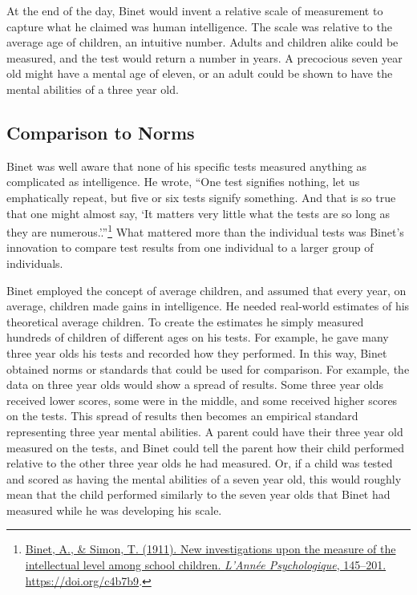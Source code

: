 \documentclass[
  oneside,
  12pt]{crumpbook}
\begin{document}
At the end of the day, Binet would invent a relative scale of measurement to capture what he claimed was human intelligence. The scale was relative to the average age of children, an intuitive number. Adults and children alike could be measured, and the test would return a number in years. A precocious seven year old might have a mental age of eleven, or an adult could be shown to have the mental abilities of a three year old.

\hypertarget{comparison-to-norms}{%
\subsection{Comparison to Norms}\label{comparison-to-norms}}

Binet was well aware that none of his specific tests measured anything as complicated as intelligence. He wrote, ``One test signifies nothing, let us emphatically repeat, but five or six tests signify
something. And that is so true that one might almost say, `It matters very little what the tests are so long as they are numerous.'.''\footnote{\protect\hyperlink{ref-binetNewInvestigationsMeasure1911}{Binet, A., \& Simon, T. (1911). New investigations upon the measure of the intellectual level among school children. \emph{L'Année Psychologique}, 145--201. \url{https://doi.org/c4b7b9}}.} What mattered more than the individual tests was Binet's innovation to compare test results from one individual to a larger group of individuals.

Binet employed the concept of average children, and assumed that every year, on average, children made gains in intelligence. He needed real-world estimates of his theoretical average children. To create the estimates he simply measured hundreds of children of different ages on his tests. For example, he gave many three year olds his tests and recorded how they performed. In this way, Binet obtained norms or standards that could be used for comparison. For example, the data on three year olds would show a spread of results. Some three year olds received lower scores, some were in the middle, and some received higher scores on the tests. This spread of results then becomes an empirical standard representing three year mental abilities. A parent could have their three year old measured on the tests, and Binet could tell the parent how their child performed relative to the other three year olds he had measured. Or, if a child was tested and scored as having the mental abilities of a seven year old, this would roughly mean that the child performed similarly to the seven year olds that Binet had measured while he was developing his scale.
\end{document}
